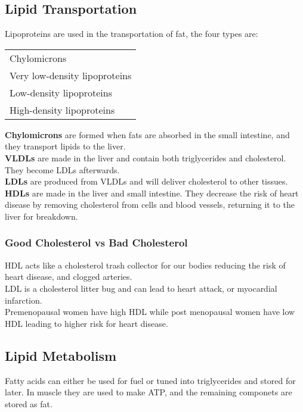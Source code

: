 \documentclass[letterpaper, 11pt]{article}
\begin{document}
\subsection{Lipid Transportation}
\label{sec:orge90a374}
Lipoproteins are used in the transportation of fat, the four types are:\\
\begin{center}
\begin{tabular}{l}
Chylomicrons\\
Very low-density lipoproteins\\
Low-density lipoproteins\\
High-density lipoproteins\\
\end{tabular}
\end{center}
\textbf{Chylomicrons} are formed when fats are absorbed in the small intestine, and they transport lipids to the liver.\\
\textbf{VLDLs} are made in the liver and contain both triglycerides and cholesterol. They become LDLs afterwards.\\
\textbf{LDLs} are produced from VLDLs and will deliver cholesterol to other tissues.\\
\textbf{HDLs} are made in the liver and small intestine. They decrease the risk of heart disease by removing cholesterol from cells and blood vessels, returning it to the liver for breakdown.\\
\subsubsection{Good Cholesterol vs Bad Cholesterol}
\label{sec:org3b2a580}
HDL acts like a cholesterol trash collector for our bodies reducing the risk of heart disease, and clogged arteries.\\
LDL is a cholesterol litter bug and can lead to heart attack, or myocardial infarction.\\
Premenopausal women have high HDL while post menopausal women have low HDL leading to higher risk for heart disease.\\
\subsection{Lipid Metabolism}
\label{sec:orgb9df946}
Fatty acids can either be used for fuel or tuned into triglycerides and stored for later. In muscle they are used to make ATP, and the remaining componets are stored as fat.\\
\end{document}
